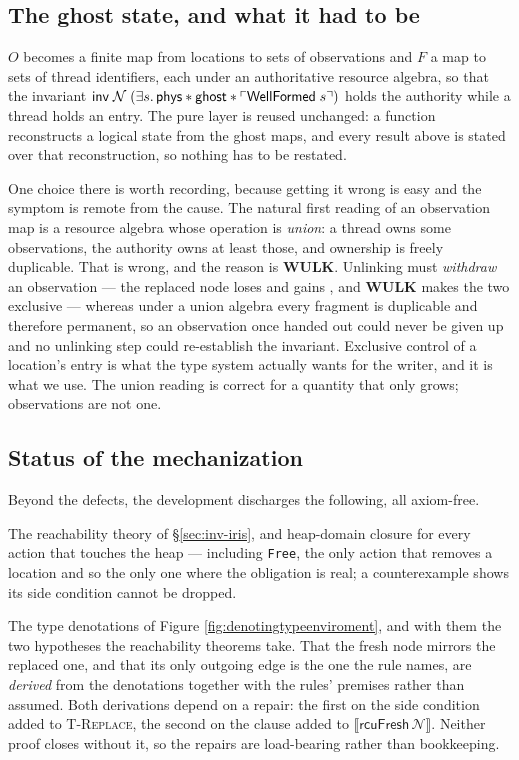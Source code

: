 \subsection{The ghost state, and what it had to be}
\label{sec:inv-ghost}

$O$ becomes a finite map from locations to sets of observations and $F$ a map to
sets of thread identifiers, each under an authoritative resource algebra, so that
the invariant
$\textsf{inv}\;\mathcal{N}\;(\exists s \ldotp \textsf{phys} \ast \textsf{ghost}
\ast \ulcorner \textsf{WellFormed}\;s \urcorner)$
holds the authority while a thread holds an entry.  The pure layer is reused
unchanged: a function reconstructs a logical state from the ghost maps, and every
result above is stated over that reconstruction, so nothing has to be restated.

One choice there is worth recording, because getting it wrong is easy and the
symptom is remote from the cause.  The natural first reading of an observation
map is a resource algebra whose operation is \emph{union}: a thread owns some
observations, the authority owns at least those, and ownership is freely
duplicable.  That is wrong, and the reason is \textbf{WULK}.  Unlinking must
\emph{withdraw} an observation --- the replaced node loses \itr{} and gains
\unlk, and \textbf{WULK} makes the two exclusive --- whereas under a union
algebra every fragment is duplicable and therefore permanent, so an observation
once handed out could never be given up and no unlinking step could re-establish
the invariant.  Exclusive control of a location's entry is what the type system
actually wants for the writer, and it is what we use.  The union reading is
correct for a quantity that only grows; observations are not one.

\subsection{Status of the mechanization}
\label{sec:inv-mech}

Beyond the defects, the development discharges the following, all axiom-free.

The reachability theory of \S\ref{sec:inv-iris}, and heap-domain closure for
every action that touches the heap --- including \texttt{Free}, the only action
that removes a location and so the only one where the obligation is real; a
counterexample shows its side condition cannot be dropped.

The type denotations of Figure \ref{fig:denotingtypeenviroment}, and with them
the two hypotheses the reachability theorems take.  That the fresh node mirrors
the replaced one, and that its only outgoing \RCU{} edge is the one the rule
names, are \emph{derived} from the denotations together with the rules'
premises rather than assumed.  Both derivations depend on a repair: the first on
the side condition added to \textsc{T-Replace}, the second on the clause added
to $\llbracket \textsf{rcuFresh}\,\mathcal{N} \rrbracket$.  Neither proof closes
without it, so the repairs are load-bearing rather than bookkeeping.

